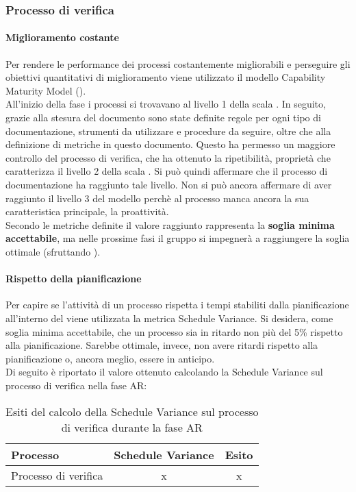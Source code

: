 \documentclass[PianoDiQualifica.tex]{subfiles}
\begin{document}
	\subsubsection{Processo di verifica}
		\paragraph{Miglioramento costante}
				Per rendere le performance dei processi costantemente migliorabili e perseguire gli obiettivi quantitativi di miglioramento viene utilizzato il modello Capability Maturity Model ().\\
		All'inizio della fase i processi si trovavano al livello 1 della scala . In seguito, grazie alla stesura del documento \NPdocRR{}  sono state definite regole per ogni tipo di documentazione, strumenti da utilizzare e procedure da seguire, oltre che alla definizione di metriche in questo documento. Questo ha permesso un maggiore controllo del processo di verifica, che ha ottenuto la ripetibilità, proprietà che caratterizza il livello 2 della scala . Si può quindi affermare che il processo di documentazione ha raggiunto tale livello. Non si può ancora affermare di aver raggiunto il livello 3 del modello perchè al processo manca ancora la sua caratteristica principale, la proattività.\\
		Secondo le metriche definite il valore raggiunto rappresenta la \textbf{soglia minima accettabile}, ma nelle prossime fasi il gruppo si impegnerà a raggiungere la soglia ottimale (sfruttando ).
		\paragraph{Rispetto della pianificazione}
		Per capire se l'attività di un processo rispetta i tempi stabiliti dalla pianificazione all'interno del \PPdocRR{} viene utilizzata la metrica Schedule Variance.
			Si desidera, come soglia minima accettabile, che un processo sia in ritardo non più del 5\% rispetto alla pianificazione. Sarebbe ottimale, invece, non avere ritardi rispetto alla pianificazione o, ancora meglio, essere in anticipo.\\
			Di seguito è riportato il valore ottenuto calcolando la Schedule Variance sul processo di verifica nella fase AR:\\
			
			\begin{table}[h]
				\centering
				\begin{tabular}{l c c}
					\hline
					\rule[-0.3cm]{0cm}{0.8cm}
					\textbf{Processo} & \textbf{Schedule Variance} & \textbf{Esito} \\
					\hline
					\rule[0cm]{0cm}{0.4cm}
					Processo di verifica & x & x \\
					\hline
				\end{tabular}
				\caption{Esiti del calcolo della Schedule Variance sul processo di verifica durante la fase AR}
			\end{table}		
		
\end{document}

